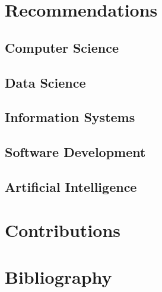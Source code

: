 \documentclass{article}
\begin{document}
	\section{Recommendations}
	\subsection{Computer Science}
	\subsection{Data Science}
	\subsection{Information Systems}
	\subsection{Software Development}
	\subsection{Artificial Intelligence}
	
	
	\section{Contributions}
	
	\section{Bibliography}
	
\end{document}
